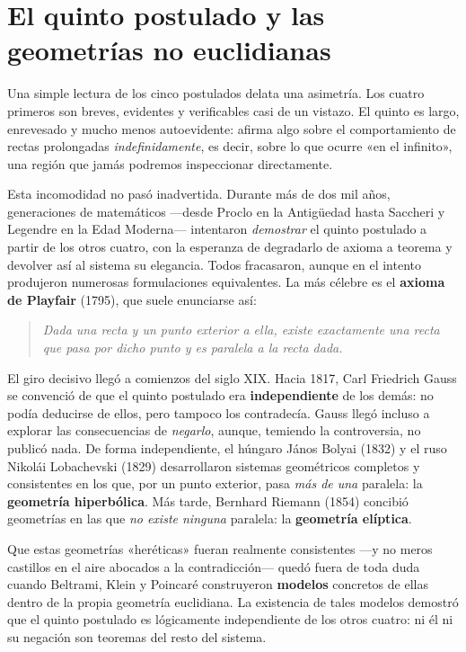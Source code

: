 \section{El quinto postulado y las geometrías no euclidianas}

Una simple lectura de los cinco postulados delata una asimetría. Los cuatro primeros son breves, evidentes y
verificables casi de un vistazo. El quinto es largo, enrevesado y mucho menos autoevidente:
afirma algo sobre el comportamiento de rectas prolongadas \emph{indefinidamente}, es decir, sobre lo que ocurre «en el
infinito», una región que jamás podremos inspeccionar directamente.

Esta incomodidad no pasó inadvertida. Durante más de dos mil años, generaciones de matemáticos —desde Proclo en la
Antigüedad hasta Saccheri y Legendre en la Edad Moderna— intentaron \emph{demostrar} el quinto postulado a partir de
los otros cuatro, con la esperanza de degradarlo de axioma a teorema y devolver así al sistema su elegancia. Todos
fracasaron, aunque en el intento produjeron numerosas formulaciones equivalentes. La más célebre es el \textbf{axioma
    de Playfair} (1795), que suele enunciarse así:

\begin{quote}
    \emph{Dada una recta y un punto exterior a ella, existe exactamente una recta que pasa por dicho punto y es paralela
        a la recta dada.}
\end{quote}

El giro decisivo llegó a comienzos del siglo XIX. Hacia 1817, Carl Friedrich Gauss se convenció de que el quinto
postulado era \textbf{independiente} de los demás: no podía deducirse de ellos, pero tampoco los contradecía. Gauss
llegó incluso a explorar las consecuencias de \emph{negarlo}, aunque, temiendo la controversia, no publicó nada. De
forma independiente, el húngaro János Bolyai (1832) y el ruso Nikolái Lobachevski (1829) desarrollaron sistemas
geométricos completos y consistentes en los que, por un punto exterior, pasa \emph{más de una} paralela: la
\textbf{geometría hiperbólica}. Más tarde, Bernhard Riemann (1854) concibió geometrías en
las que \emph{no existe ninguna} paralela: la \textbf{geometría elíptica}.

Que estas geometrías «heréticas» fueran realmente consistentes —y no meros castillos en el aire abocados a la
contradicción— quedó fuera de toda duda cuando Beltrami, Klein y Poincaré construyeron \textbf{modelos} concretos de
ellas dentro de la propia geometría euclidiana. La existencia de tales modelos demostró que el quinto postulado es
lógicamente independiente de los otros cuatro: ni él ni su negación son teoremas del resto del sistema.

